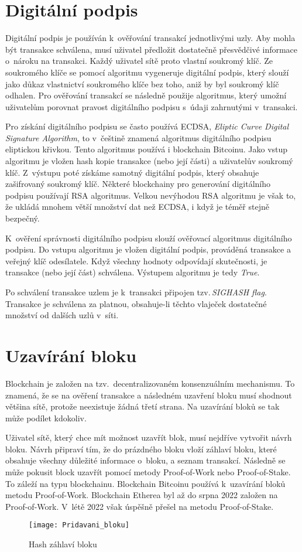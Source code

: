 \documentclass[12pt]{report}			%
\begin{document}
		\section{Digitální podpis}{
Digitální podpis je používán k~ověřování transakcí jednotlivými uzly. Aby mohla být transakce schválena, musí uživatel předložit dostatečně přesvědčivé informace o~nároku na transakci. Každý uživatel sítě proto vlastní soukromý klíč. Ze soukromého klíče se pomocí algoritmu vygeneruje digitální podpis, který slouží jako důkaz vlastnictví soukromého klíče bez toho, aniž by byl soukromý klíč odhalen. Pro ověřování transakcí se následně použije algoritmus, který umožní uživatelům porovnat pravost digitálního podpisu s~údaji zahrnutými v~transakci. \cite{Antonopoulos2017}

Pro získání digitálního podpisu se často používá ECDSA, \textit{Eliptic Curve Digital Signature Algorithm}, to v~češtině znamená algoritmus digitálního podpisu eliptickou křivkou. Tento algoritmus používá i blockchain Bitcoinu. Jako vstup algoritmu je vložen hash kopie transakce (nebo její části) a uživatelův soukromý klíč. Z~výstupu poté získáme samotný digitální podpis, který obsahuje zašifrovaný soukromý klíč. \cite{Antonopoulos2017} Některé blockchainy pro generování digitálního podpisu používají RSA algoritmus. Velkou nevýhodou RSA algoritmu je však to, že ukládá mnohem větší množství dat než ECDSA, i když je téměř stejně bezpečný. \cite{Bashir2018}

K~ověření správnosti digitálního podpisu slouží ověřovací algoritmus digitálního podpisu. Do vstupu algoritmu je vložen digitální podpis, prováděná transakce a veřejný klíč odesílatele. Když všechny hodnoty odpovídají skutečnosti, je transakce (nebo její část) schválena. Výstupem algoritmu je tedy \textit{True}. \cite{Antonopoulos2017}

Po schválení transakce uzlem je k~transakci připojen tzv.\,\textit{SIGHASH flag}. Transakce je schválena za platnou, obsahuje-li těchto vlaječek dostatečné množství od dalších uzlů v~síti. \cite{Antonopoulos2017}
}
		\section{Uzavírání bloku}{
Blockchain je založen na tzv.\, decentralizovaném konsenzuálním mechanismu. To znamená, že se na ověření transakce a následném uzavření bloku musí shodnout většina sítě, protože neexistuje žádná třetí strana. Na uzavírání bloků se tak může podílet kdokoliv. 

Uživatel sítě, který chce mít možnost uzavřít blok, musí nejdříve vytvořit návrh bloku. Návrh připraví tím, že do prázdného bloku vloží záhlaví bloku, které obsahuje všechny důležité informace o~bloku, a seznam transakcí. Následně se může pokusit block uzavřít pomocí metody Proof-of-Work nebo Proof-of-Stake. To záleží na typu blockchainu. Blockchain Bitcoinu používá k~uzavírání bloků metodu Proof-of-Work. Blockchain Etherea byl až do srpna 2022 založen na Proof-of-Work. V~létě 2022 však úspěšně přešel na metodu Proof-of-Stake. \cite{Antonopoulos2017}\cite{Weston2021}
		}
\begin{figure}[h]
\caption{Hash záhlaví bloku}
\texttt{[image: Pridavani\_bloku]}	
\centering
\label{Pridavani_bloku}
\end{figure}
\end{document}

